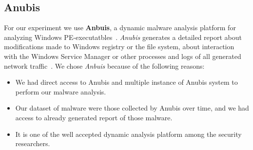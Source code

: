 \subsection{Anubis}
\label{sub:Anubis}
For our experiment we use \textbf{Anbuis}, a dynamic malware analysis platform for analyzing Windows PE-executatbles~\cite[]{anubis}.
\emph{Anubis} generates a detailed report about modifications made to Windows registry or the file system, about interaction with the Windows Service Manager or other processes and logs of all generated network traffic~\cite[]{anubis}.
We chose \emph{Anbuis} because of the following reasons:
\begin{itemize}
  \item We had direct access to Anubis and multiple instance of Anubis system to perform our malware analysis.
  \item Our dataset of malware were those collected by Anubis over time, and we had access to already generated report of those malware.
  \item It is one of the well accepted dynamic analysis platform among the security researchers.
\end{itemize}


